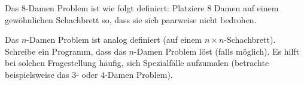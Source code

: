 \begin{aufg}
Das $8$-Damen Problem ist wie folgt definiert: Platziere $8$ Damen auf einem gewöhnlichen Schachbrett so, dass sie sich paarweise nicht bedrohen.

Das $n$-Damen Problem ist analog definiert (auf einem $n \times n$-Schachbrett). Schreibe ein Programm, dass das $n$-Damen Problem löst (falls möglich). Es hilft bei solchen Fragestellung häufig, sich Spezialfälle aufzumalen (betrachte beispielsweise das $3$- oder $4$-Damen Problem). 
\end{aufg}